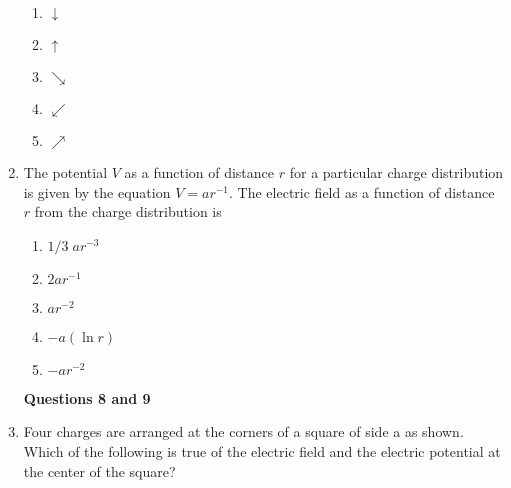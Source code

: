 \documentclass[11pt]{article}
\begin{document}
\begin{multicols}{2}
\begin{enumerate}[leftmargin=18pt]
    \begin{enumerate}[noitemsep,topsep=0pt,leftmargin=18pt,label=(\Alph*)]
    \item $\displaystyle\downarrow$
    \item $\displaystyle\uparrow$
    \item $\displaystyle\searrow$
    \item $\displaystyle\swarrow$
    \item $\displaystyle\nearrow$
    \end{enumerate}

  \item The potential $V$ as a function of distance $r$ for a particular charge
    distribution is given by the equation $V=ar^{-1}$. The electric field as
    a function of distance $r$ from the charge distribution is
    \begin{enumerate}[noitemsep,topsep=0pt,leftmargin=18pt,label=(\Alph*)]
    \item $1/3\;ar^{-3}$
    \item $2ar^{-1}$
    \item $ar^{−2}$
    \item $−a(\ln r)$
    \item $−ar^{-2}$
    \end{enumerate}

    \columnbreak

    \hspace{-18pt}\textbf{Questions 8 and 9}

    \vspace{-.2in}
    \begin{center}
    \end{center}
    
  \item\vspace{-.3in} Four charges are arranged at the corners of a square of
    side a as shown. Which of the following is true of the electric field and
    the electric potential at the center of the square?
    

\end{enumerate}
\end{multicols}
\end{document}
